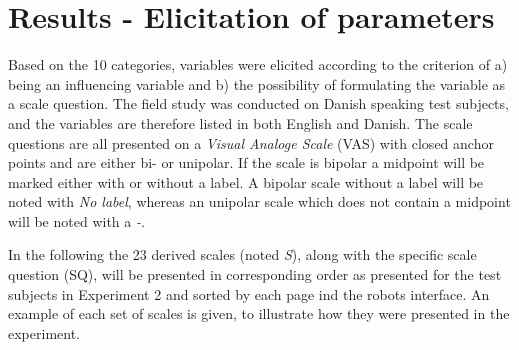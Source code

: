 \section{Results - Elicitation of parameters}
\label{ResultsElicitation}
%
Based on the 10 categories, variables were elicited according to the criterion of a) being an influencing variable and b) the possibility of formulating the variable as a scale question. The field study was conducted on Danish speaking test subjects, and the variables are therefore listed in both English and Danish. The scale questions are all presented on a \textit{Visual Analoge Scale} (VAS) with closed anchor points and are either bi- or unipolar. If the scale is bipolar a midpoint will be marked either with or without a label. A bipolar scale without a label will be noted with \textit{No label}, whereas an unipolar scale which does not contain a midpoint will be noted with a \textit{-}. 

In the following the 23 derived scales (noted \textit{S}), along with the specific scale question (SQ), will be presented in corresponding order as presented for the test subjects in Experiment 2 and sorted by each page ind the robots interface. An example of each set of scales is given, to illustrate how they were presented in the experiment.\\ 
